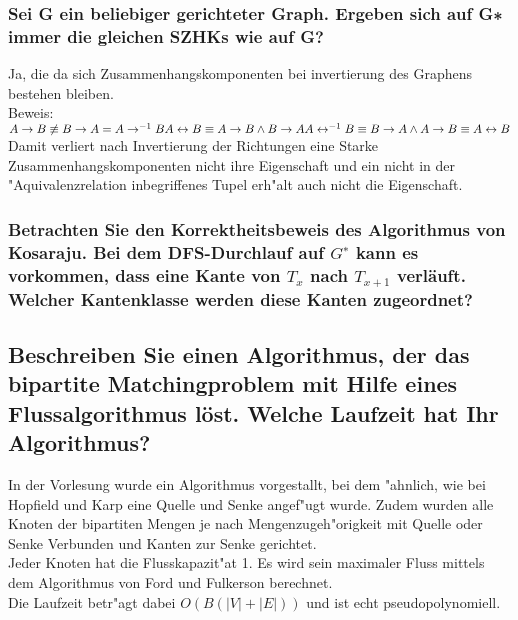\documentclass{article}
\newcommand{\ra}{\rightarrow}
\newcommand{\lra}{\leftrightarrow}
\begin{document}
\subsubsection{
    Sei G ein beliebiger gerichteter Graph. Ergeben sich auf G∗ immer die 
        gleichen SZHKs wie auf G?
    }
Ja, die da sich Zusammenhangskomponenten bei invertierung des Graphens bestehen
    bleiben.\\
Beweis:\\$
    A \ra B \not \equiv B \ra A = A \ra^{-1} B\\
    \\
    A \lra B \equiv A \ra B \land B \ra A\\
    A \lra^{-1} B \equiv B \ra A \land A \ra B \equiv A \lra B\\
    $
Damit verliert nach Invertierung der Richtungen eine Starke 
    Zusammenhangskomponenten nicht ihre Eigenschaft und ein nicht in der 
    "Aquivalenzrelation inbegriffenes Tupel erh"alt auch nicht die 
    Eigenschaft.\\
\subsubsection{
    Betrachten Sie den Korrektheitsbeweis des Algorithmus von Kosaraju. Bei dem
        DFS-Durchlauf auf $G^∗$ kann es vorkommen, dass eine Kante von 
        $T_x$ nach $T_{x+1}$ verläuft. Welcher Kantenklasse werden diese Kanten
        zugeordnet?
    }
\subsection{
    Beschreiben Sie einen Algorithmus, der das bipartite Matchingproblem mit 
        Hilfe eines Flussalgorithmus löst. Welche Laufzeit hat Ihr Algorithmus?
    }
In der Vorlesung wurde ein Algorithmus vorgestallt, bei dem "ahnlich, wie bei
    Hopfield und Karp eine Quelle und Senke angef"ugt wurde. Zudem wurden alle
    Knoten der bipartiten Mengen je nach Mengenzugeh"origkeit mit Quelle oder 
    Senke Verbunden und Kanten zur Senke gerichtet.\\
Jeder Knoten hat die Flusskapazit"at 1. Es wird sein maximaler Fluss 
    mittels dem Algorithmus von Ford und Fulkerson berechnet.\\
Die Laufzeit betr"agt dabei $O(B  (|V | + |E|))$ und ist echt 
    pseudopolynomiell.\\
\end{document}
